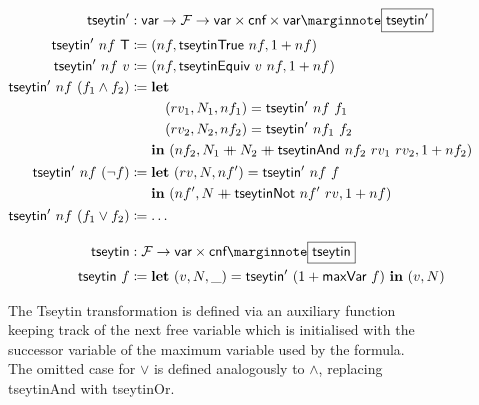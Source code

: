 \begin{figure}
\begin{align*}
  \tseytin' &: \var \rightarrow \formula \rightarrow \var \times \cnf \times \var \mnote{$\tseytin'$}\\
  \tseytin'~nf~\btrue &\defeq (nf, \textsf{tseytinTrue}~nf, \natS{nf}) \\
  \tseytin'~nf~v &\defeq (nf, \textsf{tseytinEquiv}~v~nf, \natS{nf}) \\
  \tseytin'~nf~(f_1 \land f_2) &\defeq \begin{aligned}[t] 
    &\llet \\
    & \quad (rv_1, N_1, nf_1) = \tseytin'~nf~f_1 \\
    & \quad (rv_2, N_2, nf_2) = \tseytin'~nf_1~f_2 \\
    & \lin (nf_2, N_1 \concat N_2 \concat \textsf{tseytinAnd}~nf_2~rv_1~rv_2, \natS{nf_2})
  \end{aligned}\\
    \tseytin'~nf~(\lnot f) &\defeq \begin{aligned}[t]
      &\llet (rv, N, nf') = \tseytin'~nf~f \\
      &\lin (nf', N \concat \textsf{tseytinNot}~nf'~rv, \natS{nf})
    \end{aligned} \\
  \tseytin'~nf~(f_1 \lor f_2) &\defeq \ldots \\[0.8em]
  \tseytin & : \formula \rightarrow \var \times \cnf \mnote{\tseytin}\\
  \tseytin~f &\defeq \llet (v, N, \_) = \tseytin'~(\natS{\textsf{maxVar}~f})~\lin (v, N) 
\end{align*}
\caption{The Tseytin transformation is defined via an auxiliary function keeping track of the next free variable which is initialised with the successor variable of the maximum variable used by the formula. The omitted case for $\lor$ is defined analogously to $\land$, replacing \textsf{tseytinAnd} with \textsf{tseytinOr}.}\label{lst:tseytin}
\end{figure}

